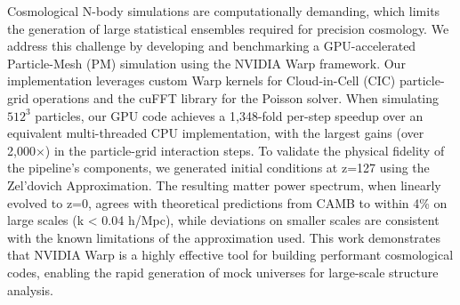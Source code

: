 \documentclass[]{article}
\begin{document}
Cosmological N-body simulations are computationally demanding, which limits the generation of large statistical ensembles required for precision cosmology. We address this challenge by developing and benchmarking a GPU-accelerated Particle-Mesh (PM) simulation using the NVIDIA Warp framework. Our implementation leverages custom Warp kernels for Cloud-in-Cell (CIC) particle-grid operations and the cuFFT library for the Poisson solver. When simulating $512^3$ particles, our GPU code achieves a 1,348-fold per-step speedup over an equivalent multi-threaded CPU implementation, with the largest gains (over 2,000$\times$) in the particle-grid interaction steps. To validate the physical fidelity of the pipeline's components, we generated initial conditions at z=127 using the Zel'dovich Approximation. The resulting matter power spectrum, when linearly evolved to z=0, agrees with theoretical predictions from CAMB to within 4\% on large scales (k < 0.04 h/Mpc), while deviations on smaller scales are consistent with the known limitations of the approximation used. This work demonstrates that NVIDIA Warp is a highly effective tool for building performant cosmological codes, enabling the rapid generation of mock universes for large-scale structure analysis.
\end{document}
